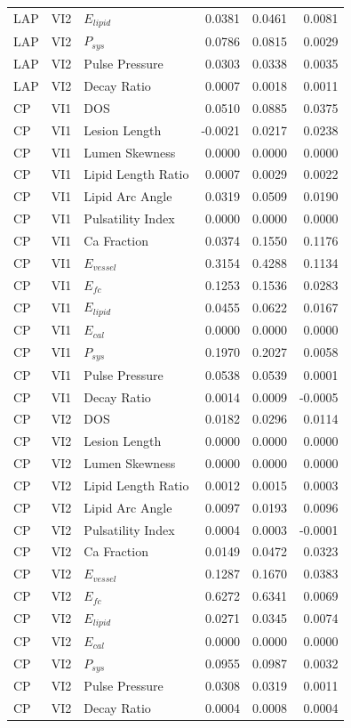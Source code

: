 \begin{longtable}{lllrrr}
LAP & VI2 & $E_{lipid}$ & 0.0381 & 0.0461 & 0.0081 \\
LAP & VI2 & $P_{sys}$ & 0.0786 & 0.0815 & 0.0029 \\
LAP & VI2 & Pulse Pressure & 0.0303 & 0.0338 & 0.0035 \\
LAP & VI2 & Decay Ratio & 0.0007 & 0.0018 & 0.0011 \\
CP & VI1 & DOS & 0.0510 & 0.0885 & 0.0375 \\
CP & VI1 & Lesion Length & -0.0021 & 0.0217 & 0.0238 \\
CP & VI1 & Lumen Skewness & 0.0000 & 0.0000 & 0.0000 \\
CP & VI1 & Lipid Length Ratio & 0.0007 & 0.0029 & 0.0022 \\
CP & VI1 & Lipid Arc Angle & 0.0319 & 0.0509 & 0.0190 \\
CP & VI1 & Pulsatility Index & 0.0000 & 0.0000 & 0.0000 \\
CP & VI1 & Ca Fraction & 0.0374 & 0.1550 & 0.1176 \\
CP & VI1 & $E_{vessel}$ & 0.3154 & 0.4288 & 0.1134 \\
CP & VI1 & $E_{fc}$ & 0.1253 & 0.1536 & 0.0283 \\
CP & VI1 & $E_{lipid}$ & 0.0455 & 0.0622 & 0.0167 \\
CP & VI1 & $E_{cal}$ & 0.0000 & 0.0000 & 0.0000 \\
CP & VI1 & $P_{sys}$ & 0.1970 & 0.2027 & 0.0058 \\
CP & VI1 & Pulse Pressure & 0.0538 & 0.0539 & 0.0001 \\
CP & VI1 & Decay Ratio & 0.0014 & 0.0009 & -0.0005 \\
CP & VI2 & DOS & 0.0182 & 0.0296 & 0.0114 \\
CP & VI2 & Lesion Length & 0.0000 & 0.0000 & 0.0000 \\
CP & VI2 & Lumen Skewness & 0.0000 & 0.0000 & 0.0000 \\
CP & VI2 & Lipid Length Ratio & 0.0012 & 0.0015 & 0.0003 \\
CP & VI2 & Lipid Arc Angle & 0.0097 & 0.0193 & 0.0096 \\
CP & VI2 & Pulsatility Index & 0.0004 & 0.0003 & -0.0001 \\
CP & VI2 & Ca Fraction & 0.0149 & 0.0472 & 0.0323 \\
CP & VI2 & $E_{vessel}$ & 0.1287 & 0.1670 & 0.0383 \\
CP & VI2 & $E_{fc}$ & 0.6272 & 0.6341 & 0.0069 \\
CP & VI2 & $E_{lipid}$ & 0.0271 & 0.0345 & 0.0074 \\
CP & VI2 & $E_{cal}$ & 0.0000 & 0.0000 & 0.0000 \\
CP & VI2 & $P_{sys}$ & 0.0955 & 0.0987 & 0.0032 \\
CP & VI2 & Pulse Pressure & 0.0308 & 0.0319 & 0.0011 \\
CP & VI2 & Decay Ratio & 0.0004 & 0.0008 & 0.0004 \\
\end{longtable}


